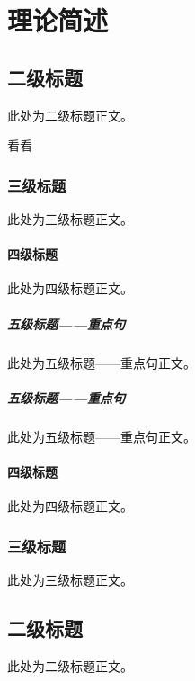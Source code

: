 
\chapter{理论简述} 
\section{二级标题}
此处为二级标题正文。

看看
\subsection{三级标题}
此处为三级标题正文。
\subsubsection{四级标题}
此处为四级标题正文。
\paragraph{五级标题——重点句}
此处为五级标题——重点句正文。
\paragraph{五级标题——重点句}
此处为五级标题——重点句正文。
\subsubsection{四级标题}
此处为四级标题正文。
\subsection{三级标题}
此处为三级标题正文。
\section{二级标题}
此处为二级标题正文。
